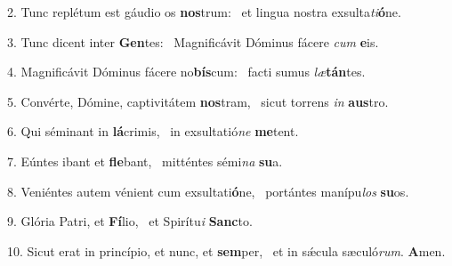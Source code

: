 2. Tunc replétum est gáudio os \textbf{nos}trum: \ast\  et lingua nostra exsulta\textit{ti}\textbf{ó}ne.\

3. Tunc dicent inter \textbf{Gen}tes: \ast\  Magnificávit Dóminus fácere \textit{cum} \textbf{e}is.\

4. Magnificávit Dóminus fácere no\textbf{bís}cum: \ast\  facti sumus \textit{læ}\textbf{tán}tes.\

5. Convérte, Dómine, captivitátem \textbf{nos}tram, \ast\  sicut torrens \textit{in} \textbf{aus}tro.\

6. Qui séminant in \textbf{lá}crimis, \ast\  in exsultatió\textit{ne} \textbf{me}tent.\

7. Eúntes ibant et \textbf{fle}bant, \ast\  mitténtes sémi\textit{na} \textbf{su}a.\

8. Veniéntes autem vénient cum exsultati\textbf{ó}ne, \ast\  portántes manípu\textit{los} \textbf{su}os.\

9. Glória Patri, et \textbf{Fí}lio, \ast\  et Spirítu\textit{i} \textbf{Sanc}to.\

10. Sicut erat in princípio, et nunc, et \textbf{sem}per, \ast\  et in sǽcula sæculó\textit{rum}. \textbf{A}men.\

